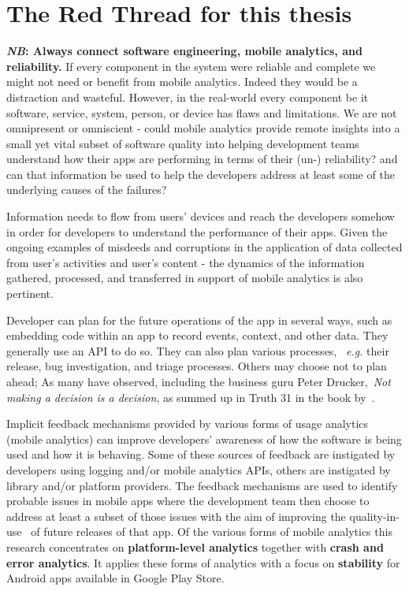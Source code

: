 \section{The Red Thread for this thesis}
\label{section_read_thread}
\textbf{\textit{NB}: Always connect software engineering, mobile analytics, and reliability.}
If every component in the system were reliable and complete we might not need or benefit from mobile analytics. Indeed they would be a distraction and wasteful. However, in the real-world every component be it software, service, system, person, or device has flaws and limitations. We are not omnipresent or omniscient - could mobile analytics provide remote insights into a small yet vital subset of software quality into helping development teams understand how their apps are performing in terms of their (un-) reliability? and can that information be used to help the developers address at least some of the underlying causes of the failures?

Information needs to flow from users' devices and reach the developers somehow in order for developers to understand the performance of their apps. Given the ongoing examples of misdeeds and corruptions in the application of data collected from user's activities and user's content - the dynamics of the information gathered, processed, and transferred in support of mobile analytics is also pertinent. 

Developer can plan for the future operations of the app in several ways, such as embedding code within an app to record events, context, and other data. They generally use an API to do so. They can also plan various processes, ~\emph{e.g.} their release, bug investigation, and triage processes. Others may choose not to plan ahead; As many have observed, including the business guru Peter Drucker,~\emph{Not making a decision is a decision}, as summed up in Truth 31 in the book by~\cite{gunther2013truth_about_better_decision_making}.

Implicit feedback mechanisms provided by various forms of usage analytics (mobile analytics) can improve developers' awareness of how the software is being used and how it is behaving. Some of these sources of feedback are instigated by developers using logging and/or mobile analytics APIs, others are instigated by library and/or platform providers. The feedback mechanisms are used to identify probable issues in mobile apps where the development team then choose to address at least a subset of those issues with the aim of improving the quality-in-use~\citep{} of future releases of that app. Of the various forms of mobile analytics this research concentrates on \textbf{platform-level analytics} together with \textbf{crash and error analytics}. It applies these forms of analytics with a focus on \textbf{stability} for Android apps available in Google Play Store.

